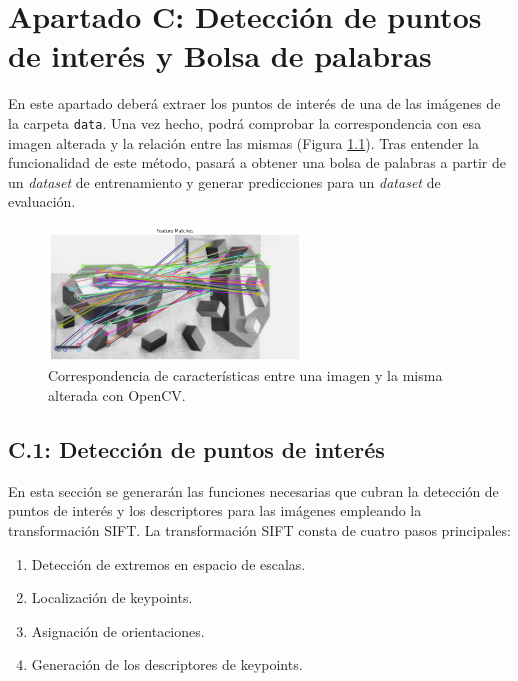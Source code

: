 \chapter{Apartado C: \textbf{Detección de puntos de interés y Bolsa de palabras}}
\label{chapter:tarea_c}

En este apartado deberá extraer los puntos de interés de una de las imágenes de la carpeta \texttt{data}. Una vez hecho, podrá comprobar la correspondencia con esa imagen alterada y la relación entre las mismas (Figura \ref{fig:feat_match}). Tras entender la funcionalidad de este método, pasará a obtener una bolsa de palabras a partir de un \textit{dataset} de entrenamiento y generar predicciones para un \textit{dataset} de evaluación.

\begin{figure}[h]
    \centering
    \includegraphics[width=0.6\textwidth]{Lab_3/template/figures/FeatureMatch.png}
    \caption{Correspondencia de características entre una imagen y la misma alterada con OpenCV.}
    \label{fig:feat_match}
\end{figure}



\section*{C.1: Detección de puntos de interés}
{}

En esta sección se generarán las funciones necesarias que cubran la detección de puntos de interés y los descriptores para las imágenes empleando la transformación SIFT.
La transformación SIFT consta de cuatro pasos principales:

\begin{enumerate}
    \item Detección de extremos en espacio de escalas.
    \item Localización de keypoints.
    \item Asignación de orientaciones.
    \item Generación de los descriptores de keypoints.
\end{enumerate}

